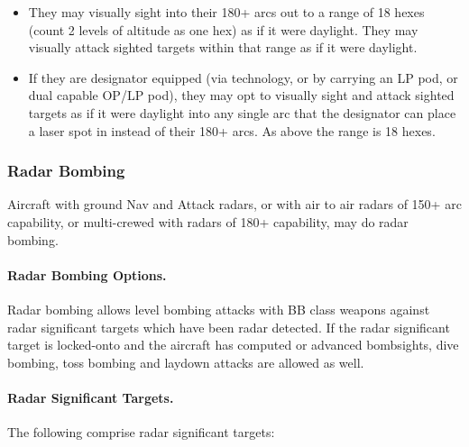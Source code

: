 \begin{itemize}

    \item They may visually sight into their 180+ arcs out to a range of 18 hexes (count 2 levels of altitude as one hex) as if it were daylight. They may visually attack sighted targets within that range as if it were daylight.

    \item If they are designator equipped (via technology, or by carrying an LP pod, or dual capable OP/LP pod), they may opt to visually sight and attack sighted targets as if it were daylight into any single arc that the designator can place a laser spot in instead of their 180+ arcs. As above the range is 18 hexes.

\end{itemize}

\subsubsection{Radar Bombing}

Aircraft with ground Nav and Attack radars, or with air to air radars of 150+ arc capability, or multi-crewed with radars of 180+ capability, may do radar bombing.

\paragraph{Radar Bombing Options.} Radar bombing allows level bombing attacks with BB class weapons against radar significant targets which have been radar detected. If the radar significant target is locked-onto and the aircraft has computed or advanced bombsights, dive bombing, toss bombing and laydown attacks are allowed as well.

\paragraph{Radar Significant Targets.} The following comprise radar significant targets:

